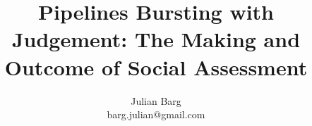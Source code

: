 \documentclass[12pt, man, natbib]{apa6}
\title{Pipelines Bursting with Judgement: The Making and Outcome of Social Assessment}
\author{Julian Barg\\barg.julian@gmail.com}
\affiliation{Ivey Business School}
\begin{document}
	
	\maketitle
	
	\singlespacing
	
	


\end{document}
